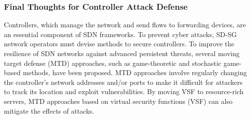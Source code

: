 \documentclass[conference]{IEEEtran}
\begin{document}
\subsubsection{Final Thoughts for Controller Attack Defense} Controllers, which manage the network and send flows to forwarding devices, are an essential component of SDN frameworks. To prevent cyber attacks, SD-SG network operators must devise methods to secure controllers. To improve the resilience of SDN networks against advanced persistent threats, several moving target defense (MTD) approaches, such as game-theoretic and stochastic game-based methods, have been proposed. MTD approaches involve regularly changing the controller's network addresses and/or ports to make it difficult for attackers to track its location and exploit vulnerabilities. By moving VSF to resource-rich servers, MTD approaches based on virtual security functions (VSF) can also mitigate the effects of attacks.

 
\end{document}

